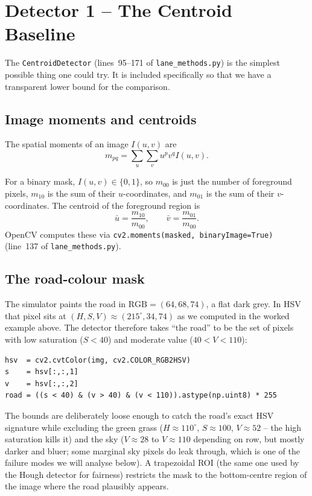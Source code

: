 \section{Detector 1 -- The Centroid Baseline}
\label{sec:centroid}

The \texttt{CentroidDetector} (lines~95--171 of
\texttt{lane\_methods.py}) is the simplest possible thing one could
try. It is included specifically so that we have a transparent lower
bound for the comparison.

\subsection{Image moments and centroids}

\begin{definition}
The spatial moments of an image $I(u,v)$ are
\begin{equation}
m_{pq} = \sum_u\sum_v u^p v^q I(u,v).
\label{eq:moments}
\end{equation}
\end{definition}

For a binary mask, $I(u,v)\in\{0,1\}$, so $m_{00}$ is just the number
of foreground pixels, $m_{10}$ is the sum of their $u$-coordinates,
and $m_{01}$ is the sum of their $v$-coordinates. The centroid of the
foreground region is
\begin{equation}
\bar u = \frac{m_{10}}{m_{00}},\qquad
\bar v = \frac{m_{01}}{m_{00}}.
\label{eq:centroid}
\end{equation}
OpenCV computes these via
\texttt{cv2.moments(masked, binaryImage=True)} (line~137 of
\texttt{lane\_methods.py}).

\subsection{The road-colour mask}

The simulator paints the road in $\text{RGB}=(64,68,74)$, a flat dark
grey. In HSV that pixel sits at $(H,S,V)\approx(215^\circ,34,74)$ as
we computed in the worked example above. The detector therefore takes
``the road'' to be the set of pixels with low saturation ($S<40$) and
moderate value ($40<V<110$):
\begin{lstlisting}
hsv  = cv2.cvtColor(img, cv2.COLOR_RGB2HSV)
s    = hsv[:,:,1]
v    = hsv[:,:,2]
road = ((s < 40) & (v > 40) & (v < 110)).astype(np.uint8) * 255
\end{lstlisting}
The bounds are deliberately loose enough to catch the road's exact
HSV signature while excluding the green grass ($H\approx 110^\circ$,
$S\approx 100$, $V\approx 52$ -- the high saturation kills it) and the
sky ($V\approx 28$ to $V\approx 110$ depending on row, but mostly
darker and bluer; some marginal sky pixels do leak through, which is
one of the failure modes we will analyse below). A trapezoidal ROI
(the same one used by the Hough detector for fairness) restricts the
mask to the bottom-centre region of the image where the road plausibly
appears.

